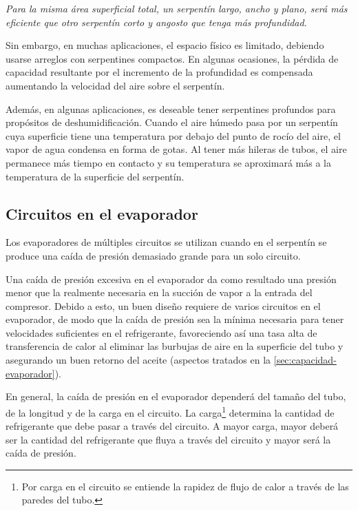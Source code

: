 				\emph{Para la misma área superficial total, un serpentín largo, ancho y plano, será más eficiente que otro serpentín corto y angosto que tenga más profundidad}.
				
				Sin embargo, en muchas aplicaciones, el espacio físico es limitado, debiendo usarse arreglos con serpentines compactos. En algunas ocasiones, la pérdida de capacidad resultante por el incremento de la profundidad es compensada aumentando la velocidad del aire sobre el serpentín.
				
				Además, en algunas aplicaciones, es deseable tener serpentines profundos para propósitos de deshumidificación. Cuando el aire húmedo pasa por un serpentín cuya superficie tiene una temperatura por debajo del punto de rocío del aire, el vapor de agua condensa en forma de gotas. Al tener más hileras de tubos, el aire permanece más tiempo en contacto y su temperatura se aproximará más a la temperatura de la superficie del serpentín.
			
				
			\subsection{Circuitos en el evaporador}
			
			
			Los evaporadores de múltiples circuitos se utilizan cuando en el serpentín se produce una caída de presión demasiado grande para un solo circuito.
			
			Una caída de presión excesiva en el evaporador da como resultado una presión menor que la realmente necesaria en la succión de vapor a la entrada del compresor. Debido a esto, un buen diseño requiere de varios circuitos en el evaporador, de modo que la caída de presión sea la mínima necesaria para tener velocidades suficientes en el refrigerante, favoreciendo así una tasa alta de transferencia de calor al eliminar las burbujas de aire en la superficie del tubo y asegurando un buen retorno del aceite (aspectos tratados en la \autoref{sec:capacidad-evaporador}).
			
			En general, la caída de presión en el evaporador dependerá del tamaño del tubo, de la longitud y de la carga en el circuito. La carga\footnote{Por carga en el circuito se entiende la rapidez de flujo de calor a través de las paredes del tubo.} determina la cantidad de refrigerante que debe pasar a través del circuito. A mayor carga, mayor deberá ser la cantidad del refrigerante que fluya a través del circuito y mayor será la caída de presión.
			

